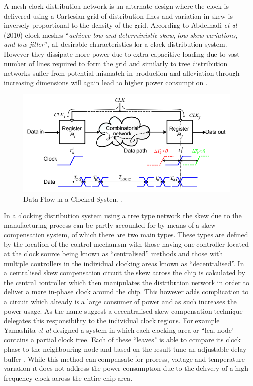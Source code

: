 \documentclass[11pt,english,british]{report}
\begin{document}
A mesh clock distribution network is an alternate design where the clock is delivered using a Cartesian grid of distribution lines and variation in skew is inversely proportional to the density of the grid. According to Abdelhadi \textit{et al} (2010) clock meshes ``\textit{achieve low and deterministic skew, low skew variations, and low jitter}'', all desirable characteristics for a clock distribution system. However they dissipate more power due to extra capacitive loading due to vast number of lines required to form the grid and similarly to tree distribution networks suffer from potential mismatch in production and alleviation through increasing dimensions will again lead to higher power consumption \cite{abdelhadi2010timing}. 
\begin{figure}[h]
	\centering
	\includegraphics[scale=0.5]{../eldar_why_precise_clocking}
	\caption{Data Flow in a Clocked System \cite{zianbetov2013phd}.}%
	\label{fig:mesh}
\end{figure}

In a clocking distribution system using a tree type network the skew due to the manufacturing process can be partly accounted for by means of a skew compensation system, of which there are two main types. These types are defined by the location of the control mechanism with those having one controller located at the clock source being known as ``centralised'' methods and those with multiple controllers in the individual clocking areas known as ``decentralised''. In a centralised skew compensation circuit the skew across the chip is calculated by the central controller which then manipulates the distribution network in order to deliver a more in-phase clock around the chip. This however adds complication to a circuit which already is a large consumer of power and as such increases the power usage.
As the name suggest a decentralised skew compensation technique delegates this responsibility to the individual clock regions. For example Yamashita \textit{et al} designed a system in which each clocking area or ``leaf node'' contains a partial clock tree. Each of these ``leaves'' is able to compare its clock phase to the neighbouring node and based on the result tune an adjustable delay buffer \cite{yamashita2005dynamic}. While this method can compensate for process, voltage and temperature variation it does not address the power consumption due to the delivery of a high frequency clock across the entire chip area.
\end{document}
